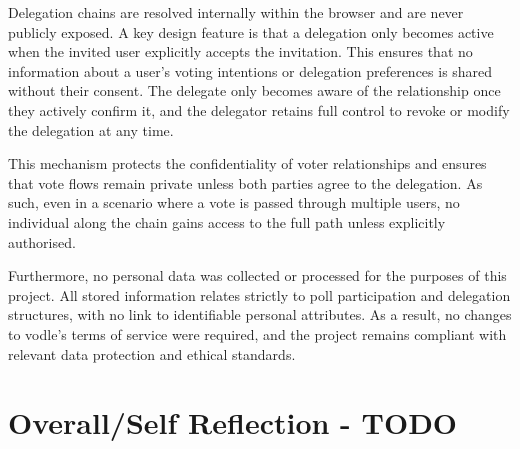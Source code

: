 Delegation chains are resolved internally within the browser and are never publicly exposed. A key design feature is that a delegation only becomes active when the invited user explicitly accepts the invitation. This ensures that no information about a user's voting intentions or delegation preferences is shared without their consent. The delegate only becomes aware of the relationship once they actively confirm it, and the delegator retains full control to revoke or modify the delegation at any time.

This mechanism protects the confidentiality of voter relationships and ensures that vote flows remain private unless both parties agree to the delegation. As such, even in a scenario where a vote is passed through multiple users, no individual along the chain gains access to the full path unless explicitly authorised.

Furthermore, no personal data was collected or processed for the purposes of this project. All stored information relates strictly to poll participation and delegation structures, with no link to identifiable personal attributes. As a result, no changes to vodle's terms of service were required, and the project remains compliant with relevant data protection and ethical standards.

\section{Overall/Self Reflection - TODO}

